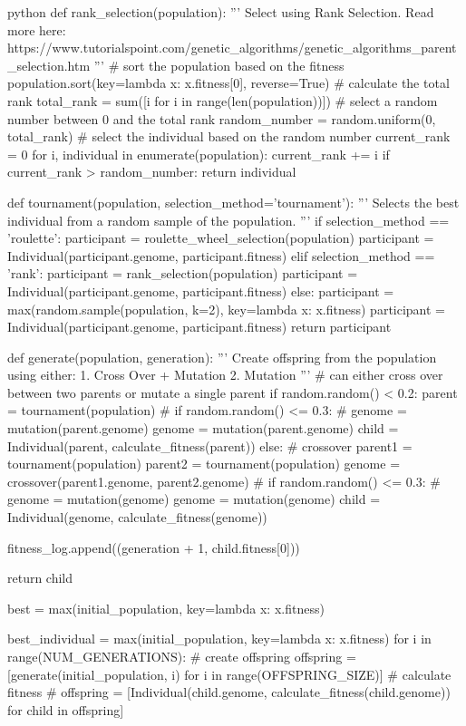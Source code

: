 \begin{mintedbox}{python}
def rank_selection(population):
    '''
    Select using Rank Selection. Read more here:
    https://www.tutorialspoint.com/genetic_algorithms/genetic_algorithms_parent_selection.htm
    '''
    # sort the population based on the fitness
    population.sort(key=lambda x: x.fitness[0], reverse=True)
    # calculate the total rank
    total_rank = sum([i for i in range(len(population))])
    # select a random number between 0 and the total rank
    random_number = random.uniform(0, total_rank)
    # select the individual based on the random number
    current_rank = 0
    for i, individual in enumerate(population):
        current_rank += i
        if current_rank > random_number:
            return individual


def tournament(population, selection_method='tournament'):
    '''
    Selects the best individual from a random sample of the population.
    '''
    if selection_method == 'roulette':
        participant = roulette_wheel_selection(population)
        participant = Individual(participant.genome, participant.fitness)
    elif selection_method == 'rank':
        participant = rank_selection(population)
        participant = Individual(participant.genome, participant.fitness)
    else:
        participant = max(random.sample(population, k=2), key=lambda x: x.fitness)
        participant = Individual(participant.genome, participant.fitness)
    return participant

def generate(population, generation):
    '''
    Create offspring from the population using either:
    1. Cross Over + Mutation
    2. Mutation
    '''
    # can either cross over between two parents or mutate a single parent
    if random.random() < 0.2:
        parent = tournament(population)
        # if random.random() <= 0.3:
        #     genome = mutation(parent.genome)
        genome = mutation(parent.genome)
        child = Individual(parent, calculate_fitness(parent))
    else:
        # crossover
        parent1 = tournament(population)
        parent2 = tournament(population)
        genome = crossover(parent1.genome, parent2.genome)
        # if random.random() <= 0.3:
        #     genome = mutation(genome)
        genome = mutation(genome)
        child = Individual(genome, calculate_fitness(genome))

    fitness_log.append((generation + 1, child.fitness[0]))

    return child

    best = max(initial_population, key=lambda x: x.fitness)

    best_individual = max(initial_population, key=lambda x: x.fitness)
    for i in range(NUM_GENERATIONS):
        # create offspring
        offspring = [generate(initial_population, i) for i in range(OFFSPRING_SIZE)]
        # calculate fitness
        # offspring = [Individual(child.genome, calculate_fitness(child.genome)) for child in offspring]


\end{mintedbox}
